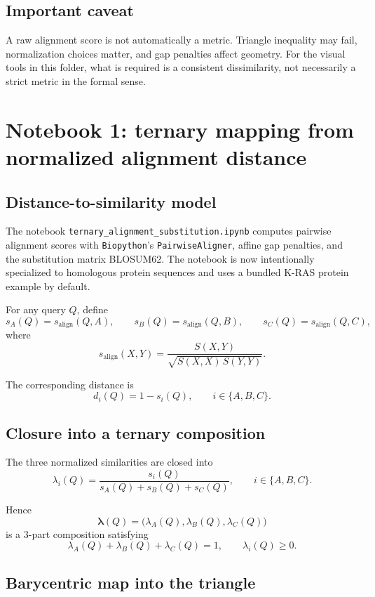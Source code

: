 \documentclass[11pt,a4paper]{article}
\begin{document}
\subsection{Important caveat}

A raw alignment score is not automatically a metric. Triangle inequality may fail, normalization choices matter, and gap penalties affect geometry. For the visual tools in this folder, what is required is a consistent dissimilarity, not necessarily a strict metric in the formal sense.

\section{Notebook 1: ternary mapping from normalized alignment distance}

\subsection{Distance-to-similarity model}

The notebook \texttt{ternary\_alignment\_substitution.ipynb} computes pairwise alignment scores with \texttt{Biopython}'s \texttt{PairwiseAligner}, affine gap penalties, and the substitution matrix BLOSUM62. The notebook is now intentionally specialized to homologous protein sequences and uses a bundled K-RAS protein example by default.

For any query $Q$, define
\[
s_A(Q)=s_{\mathrm{align}}(Q,A),\qquad
s_B(Q)=s_{\mathrm{align}}(Q,B),\qquad
s_C(Q)=s_{\mathrm{align}}(Q,C),
\]
where
\[
s_{\mathrm{align}}(X,Y)=\frac{S(X,Y)}{\sqrt{S(X,X)\,S(Y,Y)}}.
\]

The corresponding distance is
\[
d_i(Q)=1-s_i(Q),\qquad i\in\{A,B,C\}.
\]

\subsection{Closure into a ternary composition}

The three normalized similarities are closed into
\[
\lambda_i(Q)=\frac{s_i(Q)}{s_A(Q)+s_B(Q)+s_C(Q)},\qquad i\in\{A,B,C\}.
\]

Hence
\[
\bm{\lambda}(Q)=\big(\lambda_A(Q),\lambda_B(Q),\lambda_C(Q)\big)
\]
is a 3-part composition satisfying
\[
\lambda_A(Q)+\lambda_B(Q)+\lambda_C(Q)=1,\qquad \lambda_i(Q)\ge 0.
\]

\subsection{Barycentric map into the triangle}
\end{document}
